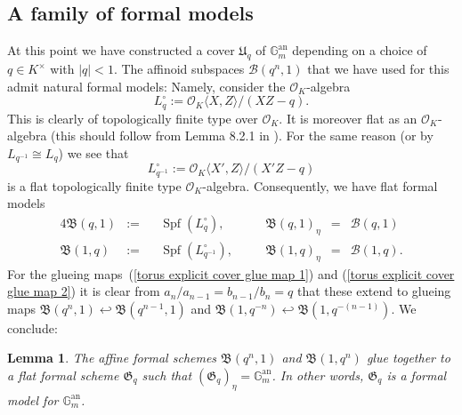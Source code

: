 \documentclass[10pt,oneside]{amsart}
\newtheorem{lemma}[theorem]{Lemma}
\theoremstyle{definition}
\begin{document}
	\subsection{A family of formal models}
	At this point we have constructed a cover $\mathfrak U_q$ of $\mathbb G_m^{\operatorname{an}}$ depending on a choice of $q\in K^\times$ with $|q|<1$. 
	The affinoid subspaces $\mathcal B(q^n,1)$ that we have used for this admit natural formal models: Namely, consider the $\mathcal O_K$-algebra
	\[L_q^\circ := \mathcal O_K\langle X,Z\rangle/(XZ-q).\]
	This is clearly of topologically finite type over $\mathcal O_K$. It is moreover flat as an $\mathcal O_K$-algebra (this should follow from Lemma 8.2.1 in \cite{Bosch lectures}). For the same reason (or by $L_{q^{-1}} \cong L_q$) we see that \[L_{q^{-1}}^\circ := \mathcal O_K\langle X',Z\rangle/(X'Z-q)\] is a flat topologically finite type $\mathcal O_K$-algebra. Consequently, we have flat formal models 
	\begin{alignat*}{4}
		\mathfrak B(q,1)&:=&& \operatorname{Spf}(L_{q}^\circ), &\quad&\mathfrak B(q,1)_\eta &=& \mathcal B(q,1)\\ 
		\mathfrak B(1,q)&:=&& \operatorname{Spf}(L_{q^{-1}}^\circ), &\quad&\mathfrak  B(1,q)_\eta &=& \mathcal B(1,q).
	\end{alignat*}
	For the glueing maps~(\ref{torus explicit cover glue map 1}) and (\ref{torus explicit cover glue map 2}) it is clear from $a_n/a_{n-1} = b_{n-1}/b_n = q$ that these extend to glueing maps $\mathfrak B(q^n,1)\hookleftarrow \mathfrak B(q^{n-1},1)$ and $\mathfrak B(1,q^{-n})\hookleftarrow \mathfrak B(1,q^{-(n-1)})$. We conclude:

	\begin{lemma}\label{formal model of torus}
		The affine formal schemes $\mathfrak B(q^n,1)$ and $\mathfrak B(1,q^n)$ glue together to a flat formal scheme $\mathfrak G_q$ such that $(\mathfrak G_q)_\eta = \mathbb G_m^{\operatorname{an}}$. In other words, $\mathfrak G_q$ is a formal model for $\mathbb G_m^{\operatorname{an}}$.
	\end{lemma}
\end{document}
